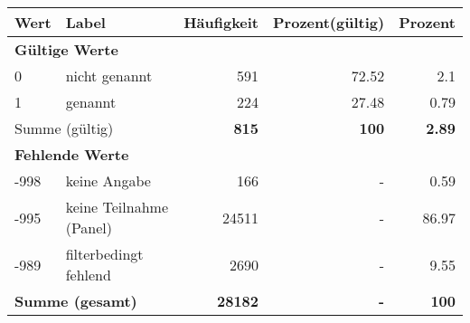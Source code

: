      \begin{longtable}{lXrrr}
     \toprule
     \textbf{Wert} & \textbf{Label} & \textbf{Häufigkeit} & \textbf{Prozent(gültig)} & \textbf{Prozent} \\
     \endhead
     \midrule
     \multicolumn{5}{l}{\textbf{Gültige Werte}}\\

     0 &
     \multicolumn{1}{X}{ nicht genannt   } &


       \num{591} &
       \num[round-mode=places,round-precision=2]{72,52} &
         \num[round-mode=places,round-precision=2]{2,1} \\

     1 &
     \multicolumn{1}{X}{ genannt   } &


       \num{224} &
       \num[round-mode=places,round-precision=2]{27,48} &
         \num[round-mode=places,round-precision=2]{0,79} \\
     \midrule
     \multicolumn{2}{l}{Summe (gültig)} &
       \textbf{\num{815}} &
     \textbf{100} &
       \textbf{\num[round-mode=places,round-precision=2]{2,89}} \\
     \multicolumn{5}{l}{\textbf{Fehlende Werte}}\\
       -998 &
       keine Angabe &
         \num{166} &
        - &
         \num[round-mode=places,round-precision=2]{0,59} \\
       -995 &
       keine Teilnahme (Panel) &
         \num{24511} &
        - &
         \num[round-mode=places,round-precision=2]{86,97} \\
       -989 &
       filterbedingt fehlend &
         \num{2690} &
        - &
         \num[round-mode=places,round-precision=2]{9,55} \\
     \midrule
     \multicolumn{2}{l}{\textbf{Summe (gesamt)}} &
          \textbf{\num{28182}} &
        \textbf{-} &
        \textbf{100} \\
     \bottomrule
     \end{longtable}
     
